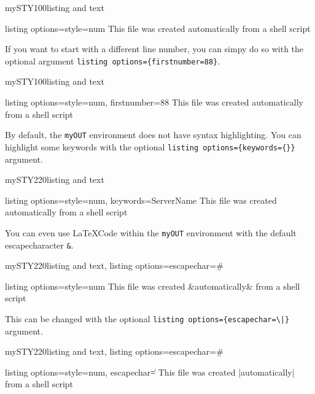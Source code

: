 \documentclass[]{myHOWTO-V001}
\begin{document}
\begin{myTEXEXdoclst}{mySTY100}{listing and text}
\begin{myOUT}{listing options={style=num}}
This file was created automatically from
a shell script
\end{myOUT}
\end{myTEXEXdoclst}

If you want to start with a different line number, you can simpy do so with the optional argument \verb|listing options={firstnumber=88}|.

\begin{myTEXEXdoclst}{mySTY100}{listing and text}
\begin{myOUT}{listing options={style=num, firstnumber=88}}
This file was created automatically from
a shell script
\end{myOUT}
\end{myTEXEXdoclst}

By default, the \Verb|myOUT| environment does not have syntax highlighting. You can highlight some keywords with the optional \verb|listing options={keywords={}}| argument.

\begin{myTEXEXdoclst}{mySTY220}{listing and text}
\begin{myOUT}{listing options={style=num, keywords={ServerName}}}
This file was created automatically from
a shell script
\end{myOUT}
\end{myTEXEXdoclst}

You can even use \LaTeX Code within the \Verb|myOUT| environment with the default escapecharacter \Verb|&|.

\begin{myTEXEXdoclst}{mySTY220}{listing and text, listing options={escapechar=\#}}
\begin{myOUT}{listing options={style=num}}
This file was created &{\color{red}automatically}& from
a shell script
\end{myOUT}
\end{myTEXEXdoclst}

This can be changed with the optional \verb#listing options={escapechar=\|}# argument.

\begin{myTEXEXdoclst}{mySTY220}{listing and text, listing options={escapechar=\#}}
\begin{myOUT}{listing options={style=num, escapechar=\|}}
This file was created |{\color{red}automatically}| from
a shell script
\end{myOUT}
\end{myTEXEXdoclst}
\end{document}
